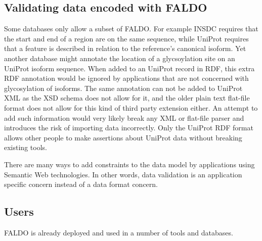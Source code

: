 \subsection*{Validating data encoded with FALDO}

Some databases only allow a subset of FALDO. 
For example INSDC requires that the start and end of a region are on the same sequence,
while UniProt requires that a feature is described in relation to the reference's canonical isoform.
Yet another database might annotate the location of a glycsoylation site on an UniProt isoform sequence.
When added to an UniProt record in RDF, this extra RDF annotation would be ignored by applications that are not concerned with glycosylation of isoforms.
The same annotation can not be added to UniProt XML as the XSD schema does not allow for it,
and the older plain text flat-file format does not allow for this kind of third party extension either.
An attempt to add such information would very likely break any XML or flat-file parser and introduces the risk of importing data incorrectly.
Only the UniProt RDF format allows other people to make assertions about UniProt data without breaking existing tools.

There are many ways to add constraints to the data model by applications using Semantic Web technologies\cite{RDFValidationReport}.
In other words, data validation is an application specific concern instead of a data format concern.

\subsection*{Users}
FALDO is already deployed and used in a number of tools and databases.

